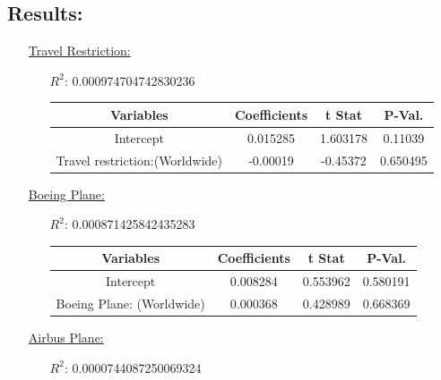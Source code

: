 \documentclass[12pt]{report}
\begin{document}
\subsection*{Results:}
\begin{enumerate}
    \item[\underline{Travel Restriction:}]
        \begin{enumerate}
            \item[$R^2$:]0.000974704742830236
            \item[]


                \begin{tabular}{|c|c|c|c|}
                    \toprule\hline
                    \textbf{Variables} & \textbf{Coefficients} & \textbf{t Stat}& \textbf{P-Val.} \\ \hline
                    Intercept & 0.015285 & 1.603178&0.11039 \\ \hline
                    Travel restriction:(Worldwide) & -0.00019 & -0.45372 &0.650495\\ \hline
                    \bottomrule
                \end{tabular}





        \end{enumerate}
    \item[\underline{Boeing Plane:}]
        \begin{enumerate}
            \item[$R^2$:]0.000871425842435283
            \item[]

                \begin{tabular}{|c|c|c|c|}
                    \toprule \hline

                    \textbf{Variables} & \textbf{Coefficients} & \textbf{t Stat}& \textbf{P-Val.} \\ \hline

                    Intercept & 0.008284 & 0.553962 &0.580191 \\ \hline
                    Boeing Plane: (Worldwide) & 0.000368 & 0.428989 &0.668369  \\ \hline
                    \bottomrule
                \end{tabular}





        \end{enumerate}
    \item[\underline{Airbus Plane:}]
        \begin{enumerate}
            \item[$R^2$:]0.0000744087250069324
            \item[]



\end{enumerate}
\end{enumerate}
\end{document}
